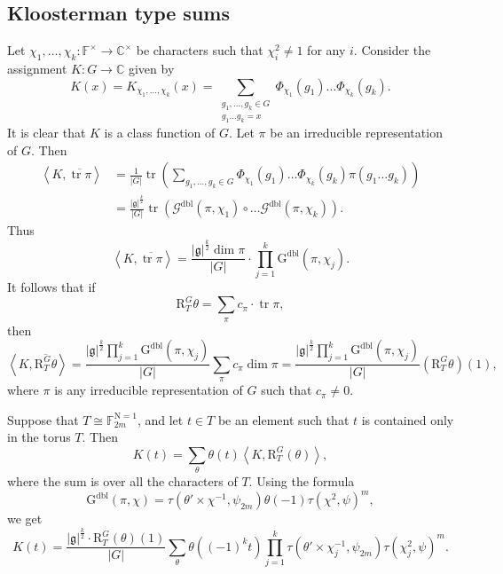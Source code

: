 \documentclass[12pt, reqno]{amsart}
\theoremstyle{definition}
\theoremstyle{definition}
\theoremstyle{definition}
\newcommand{\cComplex}{\mathbb{C}}
\newcommand{\multiplicativegroup}[1]{#1^{\times}}
\newcommand{\conjugate}[1]{\overline{#1}}
\newcommand{\sizeof}[1]{\left|#1\right|}
\newcommand{\innerproduct}[2]{\left\langle #1,#2\right\rangle}
\newcommand{\fieldCharacter}{\psi}
\newcommand{\trace}{\operatorname{tr}}
\newcommand{\aFieldNorm}{\mathrm{N}}
\newcommand{\finiteField}{\mathbb{F}}
\newcommand{\finiteFieldExtension}[1]{\finiteField_{#1}}
\newcommand{\NormOneGroup}[1]{\finiteFieldExtension{#1}^{\aFieldNorm = 1}}
\newcommand{\dblGaussSum}[2]{\mathcal{G}^{\mathrm{dbl}}\left(#1, #2\right)}
\newcommand{\dblGaussSumScalar}[2]{\mathrm{G}^{\mathrm{dbl}}\left(#1, #2\right)}
\newcommand{\lieAlgebra}{\mathfrak{g}}
\newcommand{\DeligneLusztigInduction}[2]{\mathrm{R}_{#1}^{#2}}
\begin{document}
\subsection{Kloosterman type sums}

Let $\chi_1, \dots, \chi_k \colon \multiplicativegroup{\finiteField} \to \multiplicativegroup{\cComplex}$ be characters such that $\chi_i^2 \ne 1$ for any $i$. Consider the assignment $K \colon G \to \cComplex$ given by $$K\left(x\right) = K_{\chi_1,\dots,\chi_k}\left(x\right) = \sum_{\substack{g_1, \dots, g_k \in G\\
g_1 \dots g_k = x}} \Phi_{\chi_1}\left(g_1\right) \dots \Phi_{\chi_k}\left(g_k\right).$$
It is clear that $K$ is a class function of $G$. Let $\pi$ be an irreducible representation of $G$. Then \begin{align*}
	 \innerproduct{K}{\conjugate{\trace \pi}} &= \frac{1}{\sizeof{G}}\trace \left(\sum_{g_1,\dots,g_k \in G} \Phi_{\chi_1}\left(g_1\right) \dots \Phi_{\chi_k}\left(g_k\right) \pi\left(g_1 \dots g_k\right) \right) \\
	 &= \frac{\sizeof{\lieAlgebra}^{\frac{k}{2}}}{\sizeof{G}} \trace\left( \dblGaussSum{\pi}{\chi_1} \circ \dots \dblGaussSum{\pi}{\chi_k} \right).
\end{align*}
Thus $$\innerproduct{K}{\conjugate{\trace \pi}} = \frac{\sizeof{\lieAlgebra}^{\frac{k}{2}} \dim \pi}{\sizeof{G}} \cdot \prod_{j=1}^k \dblGaussSumScalar{\pi}{\chi_j}.$$
It follows that if
$$\DeligneLusztigInduction{T}{G}\theta = \sum_{\pi} c_{\pi} \cdot \trace \pi,$$
then $$\innerproduct{K}{\conjugate{\DeligneLusztigInduction{T}{G}\theta}} = \frac{\sizeof{\lieAlgebra}^{\frac{k}{2}} \prod_{j=1}^k \dblGaussSumScalar{\pi}{\chi_j}}{\sizeof{G}} \sum_{\pi} c_{\pi} \dim \pi = \frac{\sizeof{\lieAlgebra}^{\frac{k}{2}} \prod_{j=1}^k \dblGaussSumScalar{\pi}{\chi_j}}{\sizeof{G}} \left(\DeligneLusztigInduction{T}{G}\theta\right)\left(1\right),$$
where $\pi$ is any irreducible representation of $G$ such that $c_{\pi} \ne 0$.

Suppose that $T \cong \NormOneGroup{2m}$, and let $t \in T$ be an element such that $t$ is contained only in the torus $T$. Then
$$K\left(t\right) = \sum_{\theta} \theta\left(t\right) \innerproduct{K}{\DeligneLusztigInduction{T}{G}\left(\theta\right)},$$
where the sum is over all the characters of $T$. Using the formula $$\dblGaussSumScalar{\pi}{\chi} = \tau\left( \theta' \times \chi^{-1}, \fieldCharacter_{2m} \right) \theta\left(-1\right) \tau\left(\chi^2, \fieldCharacter\right)^m,$$
we get
$$K\left(t\right) = \frac{\sizeof{\lieAlgebra}^{\frac{k}{2}} \cdot \DeligneLusztigInduction{T}{G}\left(\theta\right)\left(1\right)}{\sizeof{G}} \sum_{\theta} \theta\left( \left(-1\right)^k t\right) \prod_{j=1}^k \tau\left(\theta' \times \chi_j^{-1}, \fieldCharacter_{2m}\right) \tau\left(\chi_j^2, \fieldCharacter\right)^m.$$
\end{document}
